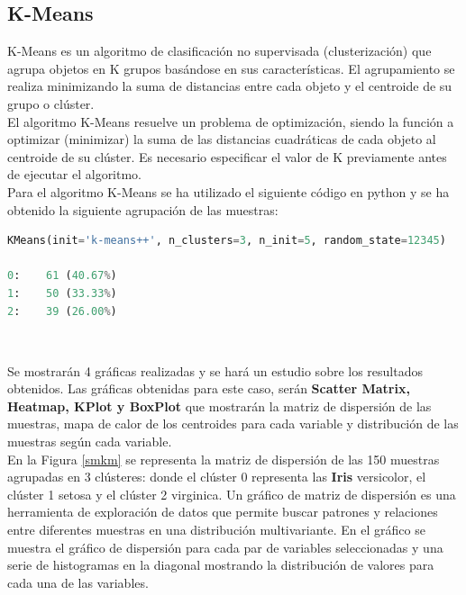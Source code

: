 \documentclass[a4paper, 20pt]{article}
\begin{document}
\clearpage

\subsection{K-Means}

K-Means es un algoritmo de clasificación no supervisada (clusterización) que agrupa objetos en K grupos basándose en sus características. El agrupamiento se realiza minimizando la suma de distancias entre cada objeto y el centroide de su grupo o clúster.\\ 

El algoritmo K-Means resuelve un problema de optimización, siendo la función a optimizar (minimizar) la suma de las distancias cuadráticas de cada objeto al centroide de su clúster. Es necesario especificar el valor de K previamente antes de ejecutar el algoritmo.\\

Para el algoritmo K-Means se ha utilizado el siguiente código en python y se ha obtenido la siguiente agrupación de las muestras:\\

\begin{lstlisting}[language=Python]
KMeans(init='k-means++', n_clusters=3, n_init=5, random_state=12345)

0:    61 (40.67%)
1:    50 (33.33%)
2:    39 (26.00%)
\end{lstlisting}\

Se mostrarán 4 gráficas realizadas y se hará un estudio sobre los resultados obtenidos. Las gráficas obtenidas para este caso, serán \textbf{Scatter Matrix, Heatmap, KPlot y BoxPlot} que mostrarán la matriz de dispersión de las muestras, mapa de calor de los centroides para cada variable y distribución de las muestras según cada variable.\\

En la Figura \ref{smkm} se representa la matriz de dispersión de las 150 muestras agrupadas en 3 clústeres: donde el clúster 0 representa las \textbf{Iris} versicolor, el clúster 1 setosa y el clúster 2 virginica. Un gráfico de matriz de dispersión es una herramienta de exploración de datos que permite buscar patrones y relaciones entre diferentes muestras en una distribución multivariante. En el gráfico se muestra el gráfico de dispersión para cada par de variables seleccionadas y una serie de histogramas en la diagonal mostrando la distribución de valores para cada una de las variables.\\
\end{document}
